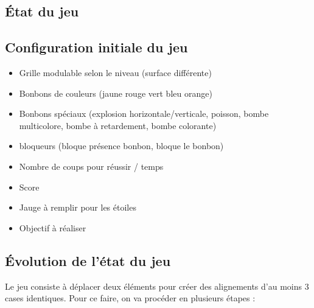 \subsection{État du jeu}

\subsection{Configuration initiale du jeu}
\begin{itemize}
        \item 
        Grille modulable selon le niveau (surface différente)
        \item 
        Bonbons de couleurs (jaune rouge vert bleu orange)
        \item 
        Bonbons spéciaux (explosion horizontale/verticale, poisson, bombe multicolore, bombe à retardement, bombe colorante)
        \item 
        bloqueurs (bloque présence bonbon, bloque le bonbon)
        \item 
        Nombre de coups pour réussir / temps
        \item 
        Score
        \item 
        Jauge à remplir pour les étoiles
        \item 
        Objectif à réaliser
\end{itemize}

\subsection{Évolution de l'état du jeu}

Le jeu consiste à déplacer deux éléments pour créer des alignements d'au moins 3 cases identiques. Pour ce faire, on va procéder en plusieurs étapes :


